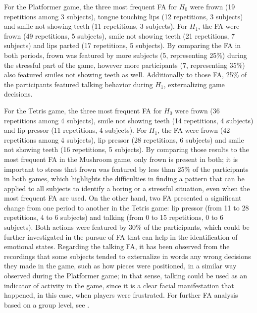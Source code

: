 For the Platformer game, the three most frequent FA for $H_0$ were frown (19 repetitions among 3 subjects), tongue touching lips (12 repetitions, 3 subjects) and smile not showing teeth (11 repetitions, 3 subjects). For $H_1$, the FA were frown (49 repetitions, 5 subjects), smile not showing teeth (21 repetitions, 7 subjects) and lips parted (17 repetitions, 5 subjects). By comparing the FA in both periods, frown was featured by more subjects (5, representing 25\%) during the stressful part of the game, however more participants (7, representing 35\%) also featured smiles not showing teeth as well. Additionally to those FA, 25\% of the participants featured talking behavior during $H_1$, externalizing game decisions.

For the Tetris game, the three most frequent FA for $H_0$ were frown (36 repetitions among 4 subjects), smile not showing teeth (14 repetitions, 4 subjects) and lip pressor (11 repetitions, 4 subjects). For $H_1$, the FA were frown (42 repetitions among 4 subjects), lip pressor (28 repetitions, 6 subjects) and smile not showing teeth (16 repetitions, 5 subjects). By comparing those results to the most frequent FA in the Mushroom game, only frown is present in both; it is important to stress that frown was featured by less than 25\% of the participants in both games, which highlights the difficulties in finding a pattern that can be applied to all subjects to identify a boring or a stressful situation, even when the most frequent FA are used. On the other hand, two FA presented a significant change from one period to another in the Tetris game: lip pressor (from 11 to 28 repetitions, 4 to 6 subjects) and talking (from 0 to 15 repetitions, 0 to 6 subjects). Both actions were featured by 30\% of the participants, which could be further investigated in the pursue of FA that can help in the identification of emotional states. Regarding the talking FA, it has been observed from the recordings that some subjects tended to externalize in words any wrong decisions they made in the game, such as how pieces were positioned, in a similar way observed during the Platformer game; in that sense, talking could be used as an indicator of activity in the game, since it is a clear facial manifestation that happened, in this case, when players were frustrated. For further FA analysis based on a group level, see \parencite{bevilacqua2016variations}.

